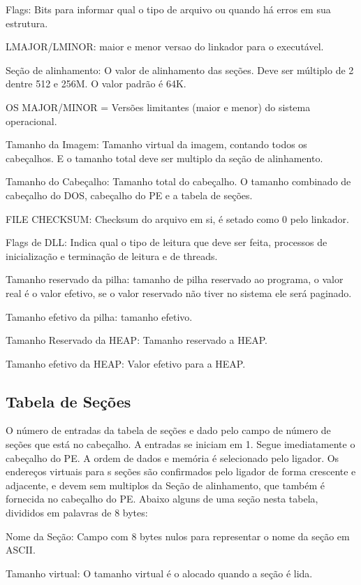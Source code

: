 Flags: Bits para informar qual o tipo de arquivo ou quando há erros
em sua estrutura.


LMAJOR/LMINOR: maior e menor versao do linkador para o executável.


Seção de alinhamento: O valor de alinhamento das seções. Deve ser
múltiplo de 2 dentre 512 e 256M. O valor padrão é 64K.


OS MAJOR/MINOR = Versões limitantes (maior e menor) do sistema operacional.


Tamanho da Imagem: Tamanho virtual da imagem, contando todos os cabeçalhos.
E o tamanho total deve ser multiplo da seção de alinhamento.


Tamanho do Cabeçalho: Tamanho total do cabeçalho. O tamanho combinado
de cabeçalho do DOS, cabeçalho do PE e a tabela de seções.


FILE CHECKSUM: Checksum do arquivo em si, é setado como 0 pelo linkador.


Flags de DLL: Indica qual o tipo de leitura que deve ser feita, processos
de inicialização e terminação de leitura e de threads.


Tamanho reservado da pilha: tamanho de pilha reservado ao programa,
o valor real é o valor efetivo, se o valor reservado não tiver no
sistema ele será paginado.


Tamanho efetivo da pilha: tamanho efetivo.


Tamanho Reservado da HEAP: Tamanho reservado a HEAP.


Tamanho efetivo da HEAP: Valor efetivo para a HEAP.


\subsection{Tabela de Seções}


O número de entradas da tabela de seções e dado pelo campo de número
de seções que está no cabeçalho. A entradas se iniciam em 1. Segue
imediatamente o cabeçalho do PE. A ordem de dados e memória é selecionado
pelo ligador. Os endereços virtuais para s seções são confirmados
pelo ligador de forma crescente e adjacente, e devem sem multiplos
da Seção de alinhamento, que também é fornecida no cabeçalho do PE.
Abaixo alguns de uma seção nesta tabela, divididos em palavras de
8 bytes:


Nome da Seção: Campo com 8 bytes nulos para representar o nome da
seção em ASCII.


Tamanho virtual: O tamanho virtual é o alocado quando a seção é lida.


